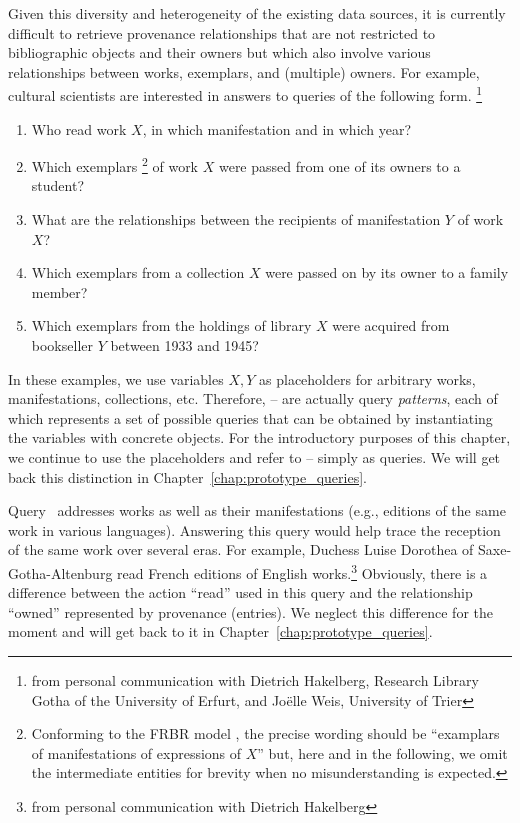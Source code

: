 Given this diversity and heterogeneity of the existing data sources,
it is currently difficult to retrieve provenance relationships
that are not restricted to bibliographic objects and their owners
but which also involve various relationships between works, exemplars, and (multiple) owners.
For example, cultural scientists are interested in answers to queries of the following form.%
\footnote{from personal communication with Dietrich Hakelberg, Research Library Gotha of the University of Erfurt, and Jo\"elle Weis, University of Trier}
%
\begin{enumerate}
  \item[\exaquery{1}]
    Who read %
    work $X$, in which manifestation and in which year?
  \item[\exaquery{2}]
    Which exemplars%
    \footnote{%
      Conforming to the FRBR model \autocite{FRBR1998},
      the precise wording should be \enquote{examplars of manifestations of expressions of $X$}
      but, here and in the following,
      we omit the intermediate entities for brevity when no misunderstanding is expected.%
    }
    of work $X$
    were passed from one of its owners to a student?
  \item[\exaquery{3}]
    What are the relationships between the recipients of manifestation $Y$ of work $X$?
  \item[\exaquery{4}]
    Which exemplars from a collection $X$ were passed on by its owner to a family member?
  \item[\exaquery{5}]
    Which exemplars from the holdings of library $X$ were acquired from bookseller $Y$
    between 1933 and 1945?
\end{enumerate}
%
In these examples, we use variables $X,Y$ as placeholders for arbitrary works,
manifestations, collections, etc. Therefore, -- are actually
query \emph{patterns}, each of which represents a set of possible queries
that can be obtained by instantiating the variables with concrete objects.
For the introductory purposes of this chapter,
we continue to use the placeholders and refer to --
simply as queries. We will get back this distinction in Chapter~\ref{chap:prototype_queries}.

Query~ addresses works as well as their manifestations
(e.g., editions of the same work in various languages).
Answering this query would help trace the reception
of the same work over several eras. For example, Duchess Luise Dorothea of Saxe-Gotha-Altenburg
read French editions of English works.\footnote{from personal communication with Dietrich Hakelberg}
Obviously, there is a difference between the action \enquote{read}
used in this query and the relationship \enquote{owned} represented by
provenance (entries). We neglect this difference for the moment
and will get back to it in Chapter~\ref{chap:prototype_queries}.

